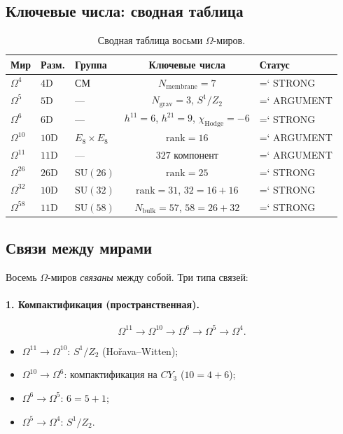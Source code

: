 \documentclass[11pt,a4paper]{article}
\newcommand{\SU}{\mathrm{SU}}
\newcommand{\CY}{CY_3}
\newcommand{\Om}{\Omega^4}
\newcommand{\Omf}{\Omega^5}
\newcommand{\Oms}{\Omega^6}
\newcommand{\Omt}{\Omega^{10}}
\newcommand{\Ome}{\Omega^{11}}
\newcommand{\Omtw}{\Omega^{26}}
\newcommand{\Omth}{\Omega^{32}}
\newcommand{\Omfi}{\Omega^{58}}
\newcommand{\Nbulk}{N_{\text{bulk}}}
\newcommand{\Nmembrane}{N_{\text{membrane}}}
\renewcommand{\texttt}[1]{{\ttfamily\hyphenchar\font=`\- #1}}
\theoremstyle{definition}
\begin{document}
\subsection{Ключевые числа: сводная таблица}
\label{subsec:key-numbers-worlds}

\begin{table}[htbp]
\centering
\caption{Сводная таблица восьми $\Omega$-миров.}
\label{tab:eight-worlds}
\begin{tabular}{lllcl}
\toprule
Мир & Разм. & Группа & Ключевые числа & Статус \\
\midrule
$\Om$ & $4$D & СМ & $\Nmembrane = 7$ & \texttt{STRONG} \\
$\Omf$ & $5$D & --- & $N_{\text{grav}} = 3$, $S^1/Z_2$ & \texttt{ARGUMENT} \\
$\Oms$ & $6$D & --- & $h^{11}=6$, $h^{21}=9$, $\chi_{\text{Hodge}}=-6$ & \texttt{STRONG} \\
$\Omt$ & $10$D & $E_8 \times E_8$ & $\mathrm{rank} = 16$ & \texttt{ARGUMENT} \\
$\Ome$ & $11$D & --- & $327$ компонент & \texttt{ARGUMENT} \\
$\Omtw$ & $26$D & $\SU(26)$ & $\mathrm{rank} = 25$ & \texttt{STRONG} \\
$\Omth$ & $10$D & $\SU(32)$ & $\mathrm{rank} = 31$, $32 = 16+16$ & \texttt{STRONG} \\
$\Omfi$ & $11$D & $\SU(58)$ & $\Nbulk = 57$, $58 = 26+32$ & \texttt{STRONG} \\
\bottomrule
\end{tabular}
\end{table}

\subsection{Связи между мирами}
\label{subsec:connections}

Восемь $\Omega$-миров \emph{связаны} между собой. Три типа связей:

\paragraph{1. Компактификация (пространственная).}
\begin{equation}
    \Ome \to \Omt \to \Oms \to \Omf \to \Om.
\end{equation}
\begin{itemize}
    \item $\Ome \to \Omt$: $S^1/Z_2$ (Hořava--Witten);
    \item $\Omt \to \Oms$: компактификация на $\CY$ ($10 = 4 + 6$);
    \item $\Oms \to \Omf$: $6 = 5 + 1$;
    \item $\Omf \to \Om$: $S^1/Z_2$.
\end{itemize}
\end{document}
